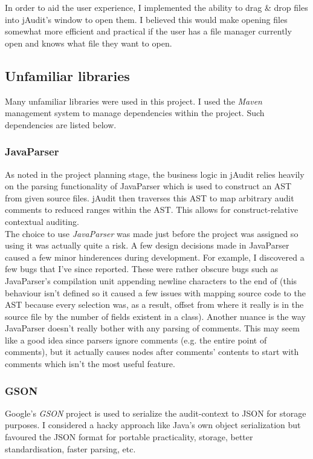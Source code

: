 \documentclass[9pt]{article}
\begin{document}
			In order to aid the user experience, I implemented the ability to
			drag \& drop files into jAudit's window to open them. I believed
			this would make opening files somewhat more efficient and practical
			if the user has a file manager currently open and knows what file
				they want to open. 

	\subsection{Unfamiliar libraries}
		Many unfamiliar libraries were used in this project. I used the
		\textit{Maven}
		management system to manage dependencies within the project. Such
		dependencies are listed below.
		
		\subsubsection{JavaParser}
			As noted in the project planning stage, the business logic in
			jAudit relies heavily on the parsing functionality of JavaParser
			which is used to construct an AST from given source files. jAudit
			then traverses this AST to map arbitrary audit comments to reduced
			ranges within the AST. This allows for construct-relative
			contextual auditing.\\

			The choice to use \textit{JavaParser} was made just before the project was
			assigned so using it was actually quite a risk. A few design
			decisions made in JavaParser caused a few minor hinderences during
			development. For example, I discovered a few bugs that I've since
			reported. These were rather obscure bugs such as JavaParser's
			compilation unit appending newline characters to the end of (this
			behaviour isn't defined so it caused a few issues with mapping
			source code to the AST because every selection was, as a result,
			offset from where it really is in the source file by the number of
			fields existent in a class). Another nuance is the way JavaParser
			doesn't really bother with any parsing of comments. This may seem
			like a good idea since parsers ignore comments (e.g. the entire
			point of comments), but it actually causes nodes after comments'
			contents to start with comments which isn't the most useful
			feature.

		\subsubsection{GSON}
			Google's \textit{GSON} project is used to serialize the audit-context to
			JSON for storage purposes. I considered a hacky approach like
			Java's own object serialization but favoured the JSON format for
			portable practicality, storage, better standardisation, faster
			parsing, etc.
\end{document}

